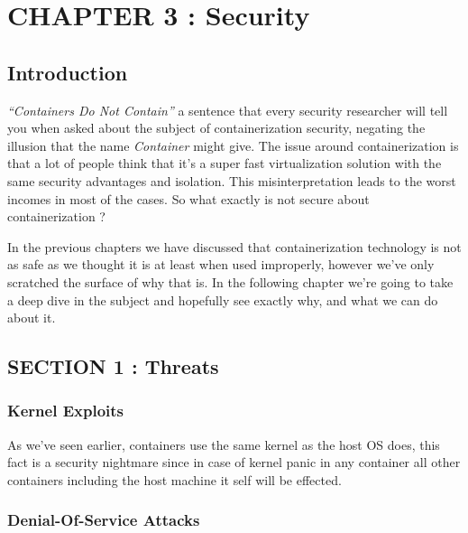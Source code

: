 \documentclass[
  14pt,
  english,
  a4paper,
]{scrreprt}
\begin{document}
\hypertarget{chapter-3-security}{%
\chapter{CHAPTER 3 : Security}\label{chapter-3-security}}

\hypertarget{introduction-5}{%
\section{Introduction}\label{introduction-5}}

\emph{``Containers Do Not Contain''} a sentence that every security
researcher will tell you when asked about the subject of
containerization security, negating the illusion that the name
\emph{Container} might give. The issue around containerization is that a
lot of people think that it's a super fast virtualization solution with
the same security advantages and isolation. This misinterpretation leads
to the worst incomes in most of the cases. So what exactly is not secure
about containerization ?

In the previous chapters we have discussed that containerization
technology is not as safe as we thought it is at least when used
improperly, however we've only scratched the surface of why that is. In
the following chapter we're going to take a deep dive in the subject and
hopefully see exactly why, and what we can do about it.

\hypertarget{section-1-threats}{%
\section{SECTION 1 : Threats}\label{section-1-threats}}

\hypertarget{kernel-exploits}{%
\subsection{Kernel Exploits}\label{kernel-exploits}}

As we've seen earlier, containers use the same kernel as the host OS
does, this fact is a security nightmare since in case of kernel panic in
any container all other containers including the host machine it self
will be effected.

\hypertarget{denial-of-service-attacks}{%
\subsection{Denial-Of-Service Attacks}\label{denial-of-service-attacks}}
\end{document}
